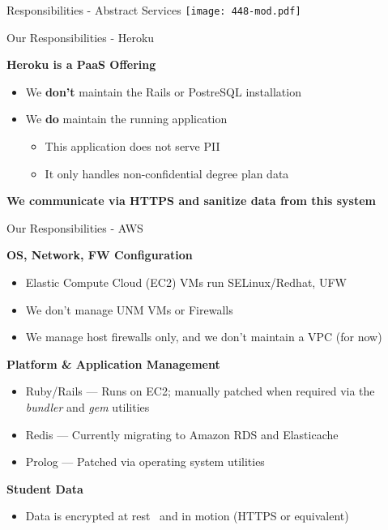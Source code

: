 \documentclass[t,handout]{beamer}   %
\begin{document}
\begin{frame}{Responsibilities - Abstract Services}
 	\texttt{[image: 448-mod.pdf]}
\end{frame}

\begin{frame}{Our Responsibilities - Heroku}

\textbf{Heroku is a PaaS Offering}
{\small
\begin{itemize}
\item We \textbf{don't} maintain the Rails or PostreSQL installation
\item We \textbf{do} maintain the running application
\begin{itemize}
\item This application does not serve PII
\item It only handles non-confidential degree plan data
\end{itemize}
\end{itemize}
}
\centering
\textbf{We communicate via HTTPS and sanitize data from this system}

\end{frame}

\begin{frame}{Our Responsibilities - AWS}

\textbf{OS, Network, FW Configuration}
{\small
\begin{itemize}
\item Elastic Compute Cloud (EC2) VMs run SELinux/Redhat, UFW
\item We don't manage UNM VMs or Firewalls
\item We manage host firewalls only, and we don't maintain a VPC (for now)
\end{itemize}
}

\pause

\textbf{Platform \& Application Management}
{\small
\begin{itemize}
\item Ruby/Rails --- Runs on EC2; manually patched when required via the \textit{bundler} and \textit{gem} utilities
\item Redis --- Currently migrating to Amazon RDS and Elasticache
\item Prolog --- Patched via operating system utilities
\end{itemize}
}

\pause

\textbf{Student Data}
{\small
\begin{itemize}
\item Data is encrypted at rest~ and in motion (HTTPS or equivalent)
\end{itemize}
}

\end{frame}
\end{document}
